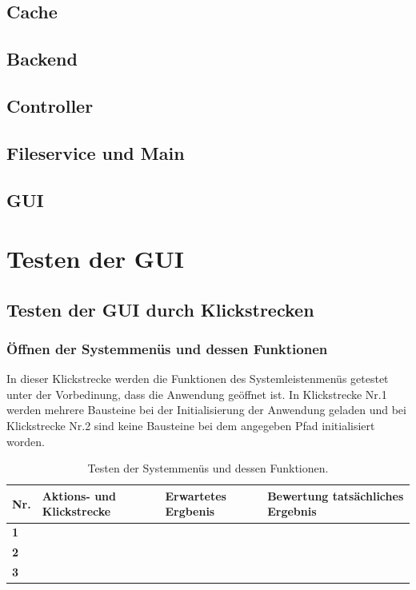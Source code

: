 \documentclass[parskip=full]{scrartcl}
\begin{document}
\subsection{Cache}
\subsection{Backend}
\subsection{Controller}
\subsection{Fileservice und Main}
\subsection{GUI}

\clearpage
\section{Testen der GUI} \label{gui}


\subsection{Testen der GUI durch Klickstrecken}

\subsubsection{Öffnen der Systemmenüs und dessen Funktionen}

In dieser Klickstrecke werden die Funktionen des Systemleistenmenüs getestet unter der Vorbedinung, dass die Anwendung geöffnet ist. In Klickstrecke Nr.1 werden mehrere Bausteine bei der Initialisierung der Anwendung geladen und bei Klickstrecke Nr.2 sind keine Bausteine bei dem angegeben Pfad initialisiert worden. 

\begin{table}[h]
\begin{tabular}{| p{} | p{} | p{} | p{} |}
	\hline
	\textbf{Nr.} & \textbf{Aktions- und Klickstrecke} & \textbf{Erwartetes Ergbenis}  & \textbf{ Bewertung tatsächliches Ergebnis} \\ \hline
	\textbf{1}
	& 
	
	&

	& 

	\\ \hline
	
	\textbf{2}
	& 

	&

	& 

	\\ \hline
	
	\textbf{3}
	& 

	&

	& 

	\\ \hline
	
\end{tabular}
\caption{Testen der Systemmenüs und dessen Funktionen.}
\label{klickMenu}
\end{table} 
\end{document}
